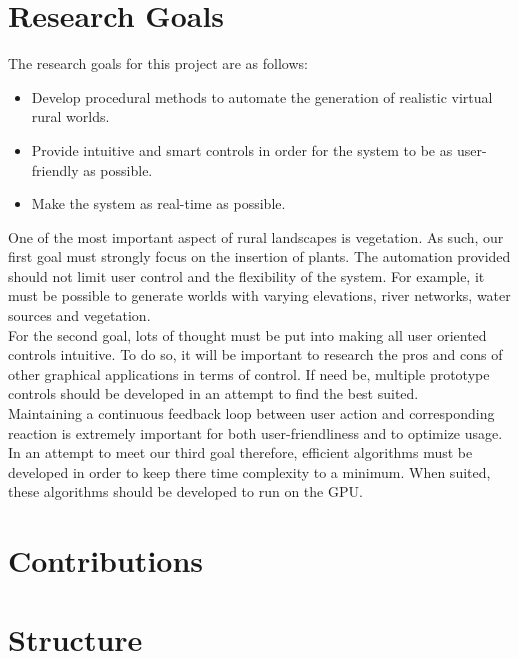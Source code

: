 \newpage
\section{Research Goals}

The research goals for this project are as follows:
\begin{itemize}
\item Develop procedural methods to automate the generation of realistic virtual rural worlds.
\item Provide intuitive and smart controls in order for the system to be as user-friendly as possible.
\item Make the system as real-time as possible.
\end{itemize}

One of the most important aspect of rural landscapes is vegetation. As such, our first goal must strongly focus on the insertion of plants. The automation provided should not limit user control and the flexibility of the system. For example, it must be possible to generate worlds with varying elevations, river networks, water sources and vegetation.\\
For the second goal, lots of thought must be put into making all user oriented controls intuitive. To do so, it will be important to research the pros and cons of other graphical applications in terms of control. If need be, multiple prototype controls should be developed in an attempt to find the best suited.\\
Maintaining a continuous feedback loop between user action and corresponding reaction is extremely important for both user-friendliness and to optimize usage. In an attempt to meet our third goal therefore, efficient algorithms must be developed in order to keep there time complexity to a minimum. When suited, these algorithms should be developed to run on the GPU.

\section{Contributions}

\section{Structure}

